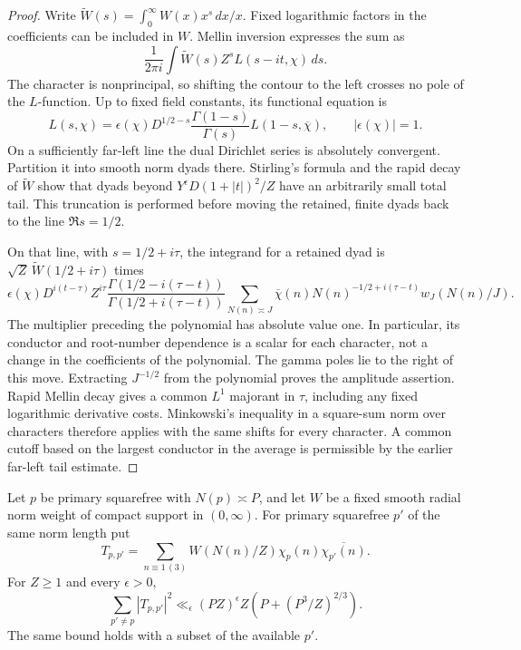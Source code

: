 \begin{proof}
Write
$\widetilde W(s)=\int_0^\infty W(x)x^s\,dx/x$.  Fixed logarithmic
factors in the coefficients can be included in $W$.
Mellin inversion expresses the sum as
\[
 \frac1{2\pi i}\int \widetilde W(s)Z^s L(s-it,\chi)\,ds.
\]
The character is nonprincipal, so shifting the contour to the left
crosses no pole of the $L$-function.  Up to fixed field constants, its
functional equation is
\[
 L(s,\chi)=\epsilon(\chi)D^{1/2-s}
       \frac{\Gamma(1-s)}{\Gamma(s)}L(1-s,\overline\chi),
 \qquad |\epsilon(\chi)|=1.
\]
On a sufficiently far-left line the dual Dirichlet series is absolutely
convergent.  Partition it into smooth norm dyads there.  Stirling's
formula and the rapid decay of $\widetilde W$ show that dyads beyond
$Y^\epsilon D(1+|t|)^2/Z$ have an arbitrarily small total tail.
This truncation is performed before moving the retained, finite dyads
back to the line $\Re s=1/2$.

On that line, with $s=1/2+i\tau$, the integrand for a retained dyad is
$\sqrt Z\,\widetilde W(1/2+i\tau)$ times
\begin{equation}
 \epsilon(\chi)D^{i(t-\tau)}Z^{i\tau}
 \frac{\Gamma(1/2-i(\tau-t))}
      {\Gamma(1/2+i(\tau-t))}
 \sum_{N(n)\asymp J}
       \overline\chi(n)N(n)^{-1/2+i(\tau-t)}w_J(N(n)/J).
 \label{eq:symmetry-line-character}
\end{equation}
The multiplier preceding the polynomial has absolute value one.
In particular, its conductor and root-number dependence is a scalar
for each character, not a change in the coefficients of the polynomial.
The gamma poles lie to the right of this move.  Extracting $J^{-1/2}$
from the polynomial proves the amplitude assertion.  Rapid Mellin
decay gives a common $L^1$ majorant in $\tau$, including any fixed
logarithmic derivative costs.  Minkowski's inequality in a square-sum
norm over characters therefore applies with the same shifts for every
character.  A common cutoff based on the largest conductor in the
average is permissible by the earlier far-left tail estimate.
\end{proof}

\begin{lemma}
\label{lem:character-gram}
Let $p$ be primary squarefree with $N(p)\asymp P$, and let $W$ be a
fixed smooth radial norm weight of compact support in $(0,\infty)$.
For primary squarefree $p'$ of the same norm length put
\[
 T_{p,p'}=\sum_{n\equiv1\, (3)}
     W(N(n)/Z)\chi_p(n)\overline{\chi_{p'}(n)}.
\]
For $Z\ge1$ and every $\epsilon>0$,
\begin{equation}
 \sum_{p'\ne p}|T_{p,p'}|^2
 \ll_\epsilon (PZ)^\epsilon
      Z\left(P+(P^3/Z)^{2/3}\right).
 \label{eq:near-orthogonality}
\end{equation}
The same bound holds with a subset of the available $p'$.
\end{lemma}

